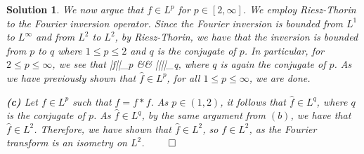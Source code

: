 \documentclass{article} %
\def\eQb#1\eQe{\begin{eqnarray*}#1\end{eqnarray*}}
\theoremstyle{quest}
\newtheorem*{solution}{Solution}
\begin{document}
\begin{solution}
\smallskip

We now argue that
$f \in L^p$ for $p \in [2,\infty]$. We employ Riesz-Thorin to the Fourier inversion operator. 
Since the Fourier inversion is bounded from $L^1$ to $L^{\infty}$ and from $L^2$ to $L^2$, by
Riesz-Thorin, we have that the inversion is bounded from $p$ to $q$ where $1 \leq p \leq 2$
and $q$ is the conjugate of $p$. In particular, for $2 \leq p \leq \infty$, we see that
\eQb
||f||_{p} &\leq& ||||_{q}, 
\eQe
where $q$ is again the conjugate of $p$.
As we have previously shown that $\hat{f} \in L^p$, for all $1 \leq p \leq \infty$, we are done.

\bigskip

\textbf{(c)} Let $f \in L^p$ such that $f = f*f$. As $p \in (1,2)$, it follows that $\hat{f} \in L^q$,
where $q$ is the conjugate of $p$.
As $\hat{f} \in L^q$, by the same argument from $(b)$, we have that $\hat{f} \in L^2$.
Therefore, we have shown that $\hat{f} \in L^2$, so $f \in L^2$, as the Fourier transform is an isometry on
$L^2$. \hfill $\qed$  

\end{solution}
\end{document}
